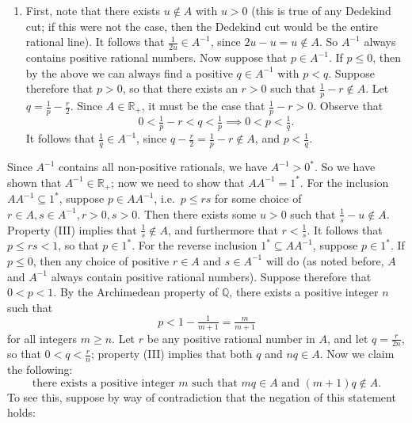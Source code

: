\documentclass[12pt]{article}
\theoremstyle{definition}
\begin{document}
\begin{enumerate}[label = (M\arabic*)]
\begin{enumerate}[label = (\Roman*)]
        \item First, note that there exists \( u \not\in A \) with \( u > 0 \) (this is true of any Dedekind cut; if this were not the case, then the Dedekind cut would be the entire rational line). It follows that \( \tfrac{1}{2u} \in A^{-1} \), since \( 2u - u = u \not\in A \). So \( A^{-1} \) always contains positive rational numbers. Now suppose that \( p \in A^{-1} \). If \( p \leq 0 \), then by the above we can always find a positive \( q \in A^{-1} \) with \( p < q \). Suppose therefore that \( p > 0 \), so that there exists an \( r > 0 \) such that \( \tfrac{1}{p} - r \not\in A \). Let \( q = \tfrac{1}{p} - \tfrac{r}{2} \). Since \( A \in \mathbb{R}_+ \), it must be the case that \( \tfrac{1}{p} - r > 0 \). Observe that
        \[
            0 < \tfrac{1}{p} - r < q < \tfrac{1}{p} \implies 0 < p < \tfrac{1}{q}.
        \]
        It follows that \( \tfrac{1}{q} \in A^{-1} \), since \( q - \tfrac{r}{2} = \tfrac{1}{p} - r \not\in A \), and \( p < \tfrac{1}{q} \).
    \end{enumerate}
    Since \( A^{-1} \) contains all non-positive rationals, we have \( A^{-1} > 0^* \). So we have shown that \( A^{-1} \in \mathbb{R}_+ \); now we need to show that \( AA^{-1} = 1^* \). For the inclusion \( AA^{-1} \subseteq 1^* \), suppose \( p \in AA^{-1} \), i.e.\ \( p \leq rs \) for some choice of \( r \in A, s \in A^{-1}, r > 0, s > 0 \). Then there exists some \( u > 0 \) such that \( \tfrac{1}{s} - u \not\in A \). Property (III) implies that \( \tfrac{1}{s} \not\in A \), and furthermore that \( r < \tfrac{1}{s} \). It follows that \( p \leq rs < 1 \), so that \( p \in 1^* \). For the reverse inclusion \( 1^* \subseteq AA^{-1} \), suppose \( p \in 1^* \). If \( p \leq 0 \), then any choice of positive \( r \in A \) and \( s \in A^{-1} \) will do (as noted before, \( A \) and \( A^{-1} \) always contain positive rational numbers). Suppose therefore that \( 0 < p < 1 \). By the Archimedean property of \( \mathbb{Q} \), there exists a positive integer \( n \) such that
    \[
        p < 1 - \tfrac{1}{m+1} = \tfrac{m}{m+1} \tag{\(*\)}
    \]
    for all integers \( m \geq n \). Let \( r \) be any positive rational number in \( A \), and let \( q = \tfrac{r}{2n} \), so that \( 0 < q < \tfrac{r}{n} \); property (III) implies that both \( q \) and \( nq \in A \). Now we claim the following:
    \[
        \text{there exists a positive integer } m \text{ such that } mq \in A \text{ and } (m+1)q \not\in A.
    \]
    To see this, suppose by way of contradiction that the negation of this statement holds:

\end{enumerate}
\end{document}
